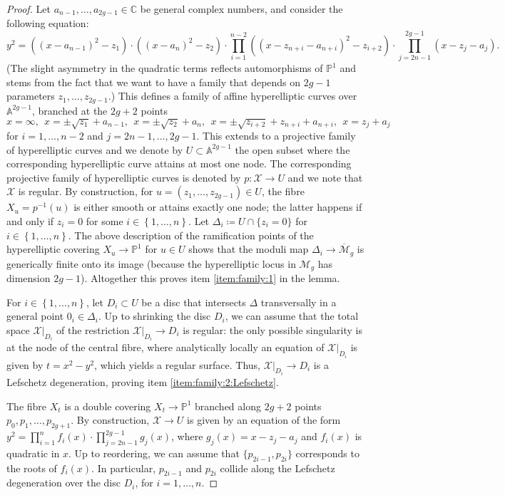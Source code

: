 \documentclass[a4paper,11pt,reqno]{amsart}
\numberwithin{equation}{section}
\theoremstyle{plain}
\theoremstyle{definition}
\newcommand{\A}{\mathbb A}
\newcommand{\C}{\mathbb C}
\newcommand{\CP}{\mathbb P}
\newcommand{\ca}[1]{{\mathcal{#1}}}
\newcommand{\set}[1]{\left\{ #1 \right\}}
\begin{document}
\begin{proof}
Let $a_{n-1},\dots ,a_{2g-1}\in \C$ be general complex numbers, and consider the following equation:
$$
y^2=((x-a_{n-1})^2-z_1)\cdot ((x-a_n)^2-z_2)\cdot\prod_{i=1}^{n-2}((x-z_{n+i}-a_{n+i})^2-z_{i+2})  \cdot \prod_{j=2n-1}^{2g-1}(x-z_j-a_j).
$$
(The slight asymmetry in the quadratic terms reflects automorphisms of $\CP^1$ and stems from the fact that we want to have a family that depends on $2g-1$ parameters $z_1,\dots ,z_{2g-1}$.) 
This defines a family of affine hyperelliptic curves over $\A^{2g-1}$, branched at the $2g+2$ points
$$
x=\infty,\ \ x=\pm \sqrt{z_1} + a_{n-1},\ \ x=\pm \sqrt{z_2}+a_n,\ \ x=\pm\sqrt{z_{i+2}}+z_{n+i}+a_{n+i},\  \ x=z_j+a_j
$$
for $i=1,\dots ,n-2$ and $j=2n-1,\dots ,2g-1$.
This extends to a projective family of hyperelliptic curves and we denote by $U\subset \A^{2g-1}$ the open subset where the corresponding hyperelliptic curve attains at most one node.
The corresponding projective family of hyperelliptic curves is denoted by $p \colon \ca X \to U$ and we note that $\ca X$ is regular. By construction, for $u = (z_1, \dotsc, z_{2g-1}) \in U$, the fibre $X_u = p^{-1}(u)$ is either smooth or attains exactly one node; the latter happens if and only if $z_i = 0$ for some $i \in \set{1, \dotsc, n}$.   
Let $\Delta_i \coloneqq U\cap \{z_i=0\}$ for $i\in \set{1,\dots ,n}$.
The above description of the ramification points of the hyperelliptic covering $X_u\to \CP^1$ for $u\in U$ shows that the moduli map $\Delta_i\to \overline{\mathcal M}_g$ is generically  finite onto its image (because the hyperelliptic locus in $\mathcal M_g$ has dimension $2g-1$). 
Altogether this proves item \eqref{item:family:1} in the lemma.


For $i\in \set{1, \dotsc, n}$, let $D_i \subset U$ be a disc that intersects $\Delta$ transversally in a general point $0_i \in \Delta_i$.
Up to shrinking the disc $D_i$, we can assume that the total space $\ca X|_{D_i}$ of the restriction $\ca X|_{D_i} \to D_i$ is regular: the only possible singularity is at the node of the central fibre, where analytically locally an equation of $\mathcal X|_{D_i}$ is given by $t=x^2-y^2$, which yields a regular surface. 
Thus, $\ca X|_{D_i} \to D_i$ is a Lefschetz degeneration, proving item \eqref{item:family:2:Lefschetz}.

The fibre $X_t$ is a double covering $X_t\to \CP^1$ branched along $2g+2$ points $p_0,p_1,\dots ,p_{2g+1}$.
By construction, $\mathcal X\to U$ is given by an equation of the form $y^2=\prod_{i=1}^{n}f_i(x)\cdot \prod_{j=2n-1}^{2g-1} g_j(x)$, where $g_j(x)=x-z_j-a_j$ and $f_i(x)$ is quadratic in $x$. 
Up to reordering, we can assume that $\{p_{2i-1},p_{2i}\}$ corresponds to the roots of $f_i(x)$.
In particular, $p_{2i-1}$ and $p_{2i}$ collide along the Lefschetz degeneration over the disc $D_i$, for $i=1,\dots ,n$.


\end{proof}
\end{document}
